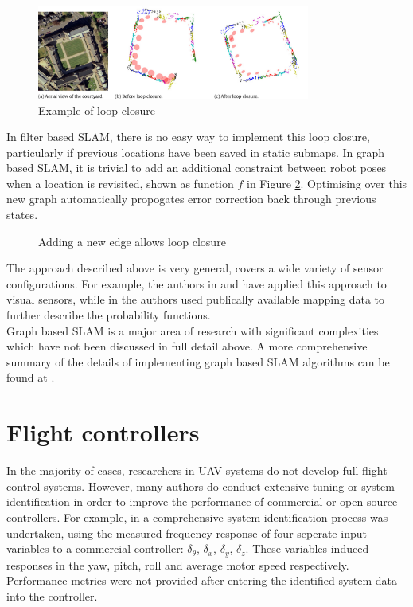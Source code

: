 \documentclass[capstone_report.tex]{subfiles}
\begin{document}
\begin{figure}[H]
   \centering
   \includegraphics[width=0.8\textwidth]{imgs/loopClosure.png}
   \caption{Example of loop closure\label{fig:loopClose}}
\end{figure} 

In filter based SLAM, there is no easy way to implement this loop closure, particularly if previous locations have been saved in static submaps. In graph based SLAM, it is trivial to add an additional constraint between robot poses when a location is revisited, shown as function $f$ in Figure \ref{fig:loopClose2}. Optimising over this new graph automatically propogates error correction back through previous states.

\begin{figure}[H]
\centering
  
  \caption{Adding a new edge allows loop closure\label{fig:loopClose2}}
\end{figure}

The approach described above is very general, covers a wide variety of sensor configurations. For example, the authors in \cite{hong} and \cite{annaiyan} have applied this approach to visual sensors, while in \cite{vysotska} the authors used publically available mapping data to further describe the probability functions. \\

Graph based SLAM is a major area of research with significant complexities which have not been discussed in full detail above. A more comprehensive summary of the details of implementing graph based SLAM algorithms can be found at \cite{grisetti}. 

\section{Flight controllers}
In the majority of cases, researchers in UAV systems do not develop full flight control systems. However, many authors do conduct extensive tuning or system identification in order to improve the performance of commercial or open-source controllers. For example, in \cite{feicui} a comprehensive system identification process was undertaken, using the measured frequency response of four seperate input variables to a commercial controller: $\delta_\theta$, $\delta_x$, $\delta_y$, $\delta_z$. These variables induced responses in the yaw, pitch, roll and average motor speed respectively. Performance metrics were not provided after entering the identified system data into the controller.\\
\end{document}
